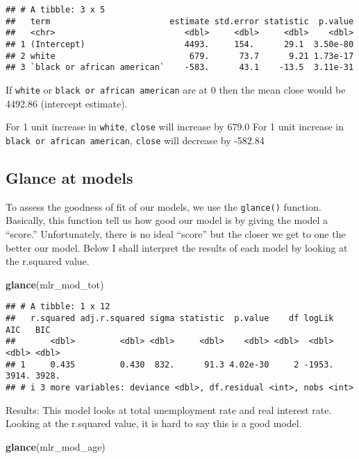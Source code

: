 \documentclass[
]{article}
\newenvironment{Shaded}{\begin{snugshade}}{\end{snugshade}}
\newcommand{\FunctionTok}[1]{\textcolor[rgb]{0.13,0.29,0.53}{\textbf{#1}}}
\newcommand{\NormalTok}[1]{#1}
\begin{document}
\begin{verbatim}
## # A tibble: 3 x 5
##   term                        estimate std.error statistic  p.value
##   <chr>                          <dbl>     <dbl>     <dbl>    <dbl>
## 1 (Intercept)                    4493.     154.      29.1  3.50e-80
## 2 white                           679.      73.7      9.21 1.73e-17
## 3 `black or african american`    -583.      43.1    -13.5  3.11e-31
\end{verbatim}

If \texttt{white} or \texttt{black\ or\ african\ american} are at 0 then
the mean close would be 4492.86 (intercept estimate).

For 1 unit increase in \texttt{white}, \texttt{close} will increase by
679.0 For 1 unit increase in \texttt{black\ or\ african\ american},
\texttt{close} will decrease by -582.84

\hypertarget{glance-at-models}{%
\subsection{Glance at models}\label{glance-at-models}}

To assess the goodness of fit of our models, we use the
\texttt{glance()} function. Basically, this function tell us how good
our model is by giving the model a ``score.'' Unfortunately, there is no
ideal ``score'' but the closer we get to one the better our model. Below
I shall interpret the results of each model by looking at the r.squared
value.

\begin{Shaded}
\begin{Highlighting}[]
\FunctionTok{glance}\NormalTok{(mlr\_mod\_tot)}
\end{Highlighting}
\end{Shaded}

\begin{verbatim}
## # A tibble: 1 x 12
##   r.squared adj.r.squared sigma statistic  p.value    df logLik   AIC   BIC
##       <dbl>         <dbl> <dbl>     <dbl>    <dbl> <dbl>  <dbl> <dbl> <dbl>
## 1     0.435         0.430  832.      91.3 4.02e-30     2 -1953. 3914. 3928.
## # i 3 more variables: deviance <dbl>, df.residual <int>, nobs <int>
\end{verbatim}

Results: This model looks at total unemployment rate and real interest
rate. Looking at the r.squared value, it is hard to say this is a good
model.

\begin{Shaded}
\begin{Highlighting}[]
\FunctionTok{glance}\NormalTok{(mlr\_mod\_age)}
\end{Highlighting}
\end{Shaded}
\end{document}
